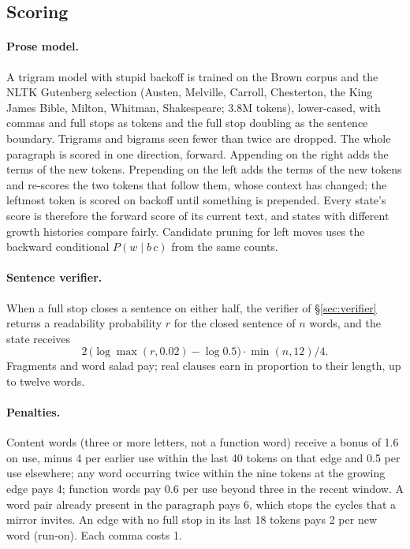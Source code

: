\documentclass[11pt]{article}
\begin{document}
\subsection{Scoring}
\paragraph{Prose model.} A trigram model with stupid backoff \citep{brants-etal-2007-large} is trained on the Brown corpus and the NLTK Gutenberg selection (Austen, Melville, Carroll, Chesterton, the King James Bible, Milton, Whitman, Shakespeare; 3.8M tokens), lower-cased, with commas and full stops as tokens and the full stop doubling as the sentence boundary. Trigrams and bigrams seen fewer than twice are dropped. The whole paragraph is scored in one direction, forward. Appending on the right adds the terms of the new tokens. Prepending on the left adds the terms of the new tokens and re-scores the two tokens that follow them, whose context has changed; the leftmost token is scored on backoff until something is prepended. Every state's score is therefore the forward score of its current text, and states with different growth histories compare fairly. Candidate pruning for left moves uses the backward conditional $P(w \mid b\,c)$ from the same counts.

\paragraph{Sentence verifier.} When a full stop closes a sentence on either half, the verifier of \S\ref{sec:verifier} returns a readability probability $r$ for the closed sentence of $n$ words, and the state receives
\[
  2\,\bigl(\log\max(r, 0.02) - \log 0.5\bigr)\cdot \min(n,12)/4 .
\]
Fragments and word salad pay; real clauses earn in proportion to their length, up to twelve words.

\paragraph{Penalties.} Content words (three or more letters, not a function word) receive a bonus of 1.6 on use, minus 4 per earlier use within the last 40 tokens on that edge and 0.5 per use elsewhere; any word occurring twice within the nine tokens at the growing edge pays 4; function words pay 0.6 per use beyond three in the recent window. A word pair already present in the paragraph pays 6, which stops the cycles that a mirror invites. An edge with no full stop in its last 18 tokens pays 2 per new word (run-on). Each comma costs 1.
\end{document}
